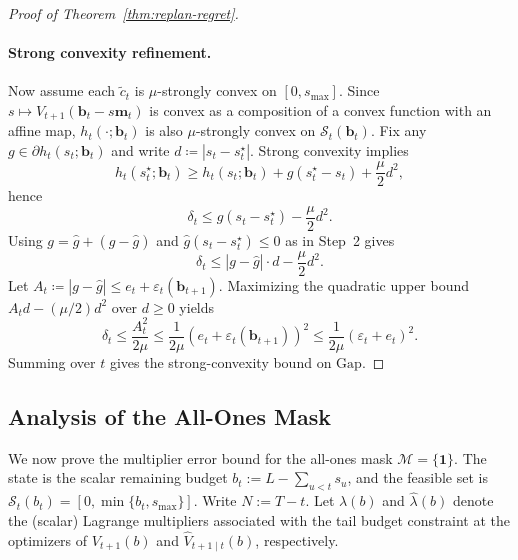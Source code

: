 \documentclass{uai2026} %
\newcommand{\1}{\mathbf{1}}
\newcommand{\scalt}{\mathcal{S}_{t}}
\renewcommand{\epsilon}{\varepsilon}
\newcommand{\mcal}{\mathcal{M}}
\begin{document}
\begin{proof}[Proof of Theorem~\ref{thm:replan-regret}]
  \paragraph{Strong convexity refinement.}
  Now assume each $\tilde{c}_t$ is $\mu$-strongly convex on $[0,s_{\max}]$.
  Since $s\mapsto V_{t+1}(\mathbf{b}_t-s\mathbf{m}_t)$ is convex as a composition of a convex function with an affine map, $h_t(\cdot;\mathbf{b}_t)$ is also $\mu$-strongly convex on $\scalt(\mathbf{b}_t)$.
  Fix any $g\in\partial h_t(s_t;\mathbf{b}_t)$ and write $d\coloneqq |s_t-s_t^{\star}|$.
  Strong convexity implies
  \begin{equation*}
    h_t(s_t^{\star};\mathbf{b}_t)
    \ge h_t(s_t;\mathbf{b}_t)+g(s_t^{\star}-s_t)+\frac{\mu}{2}d^2,
  \end{equation*}
  hence
  \begin{equation*}
    \delta_t
    \le g(s_t-s_t^{\star})-\frac{\mu}{2}d^2.
  \end{equation*}
  Using $g=\hat{g}+(g-\hat{g})$ and $\hat{g}(s_t-s_t^{\star})\le 0$ as in Step~2 gives
  \begin{equation*}
    \delta_t
    \le |g-\hat{g}|\cdot d-\frac{\mu}{2}d^2.
  \end{equation*}
  Let $A_t\coloneqq |g-\hat{g}|\le e_t+\epsilon_t(\mathbf{b}_{t+1})$.
  Maximizing the quadratic upper bound $A_t d-(\mu/2)d^2$ over $d\ge 0$ yields
  \begin{equation*}
    \delta_t
    \le \frac{A_t^2}{2\mu}
    \le \frac{1}{2\mu}\left(e_t+\epsilon_t(\mathbf{b}_{t+1})\right)^2
    \le \frac{1}{2\mu}(\epsilon_t+e_t)^2.
  \end{equation*}
  Summing over $t$ gives the strong-convexity bound on $\mathrm{Gap}$.
\end{proof}

\subsection{Analysis of the All-Ones Mask}
\label{app:dual-bounds}

We now prove the multiplier error bound for the all-ones mask $\mcal=\{\1\}$.
The state is the scalar remaining budget $b_t := L - \sum_{u<t} s_u$,
and the feasible set is $\scalt(b_t) = [0,\min\{b_t,s_{\max}\}]$.
Write $N := T-t$.
Let $\lambda(b)$ and $\hat{\lambda}(b)$ denote the (scalar) Lagrange multipliers associated with the tail budget constraint at the optimizers of $V_{t+1}(b)$ and $\hat{V}_{t+1\mid t}(b)$, respectively.
\end{document}
